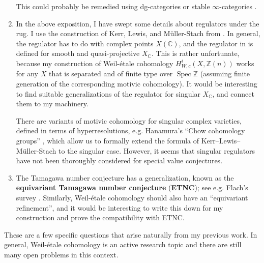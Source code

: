 \documentclass{article}
\DeclareMathOperator{\Spec}{Spec}
\newcommand{\ZZ}{\mathbb{Z}}
\newcommand{\CC}{\mathbb{C}}
\begin{document}
\begin{enumerate}
  This could probably be remedied using dg-categories \cite{Toen-2011} or
  stable $\infty$-categories \cite{Lurie-stable-oo}.

\item In the above exposition, I have swept some details about regulators under
  the rug. I use the construction of Kerr, Lewis, and Müller-Stach from
  \cite{KLMS}. In general, the regulator has to do with complex points
  $X (\CC)$, and the regulator in \cite{KLMS} is defined for smooth and
  quasi-projective $X_\CC$. This is rather unfortunate, because my construction
  of Weil-étale cohomology $H^i_{W,c} (X, \ZZ (n))$ works for any $X$ that is
  separated and of finite type over $\Spec \ZZ$ (assuming finite generation of
  the corresponding motivic cohomology). It would be interesting to find
  suitable generalizations of the regulator for singular $X_\CC$, and connect
  them to my machinery.

  There are variants of motivic cohomology for singular complex varieties,
  defined in terms of hyperresolutions, e.g. Hanamura's ``Chow cohomology
  groups'' \cite{Hanamura-2000}, which allow us to formally extend the formula
  of Kerr--Lewis--Müller-Stach to the singular case. However, it seems that
  singular regulators have not been thoroughly considered for special value
  conjectures.

\item The Tamagawa number conjecture has a generalization, known as the
  \textbf{equivariant Tamagawa number conjecture} (\textbf{ETNC});
  see e.g. Flach's survey \cite{Flach-ETNC}. Similarly, Weil-étale cohomology
  should also have an ``equivariant refinement'', and it would be interesting to
  write this down for my construction and prove the compatibility with ETNC.
\end{enumerate}

These are a few specific questions that arise naturally from my previous
work. In general, Weil-étale cohomology is an active research topic and there
are still many open problems in this context.



\end{document}
